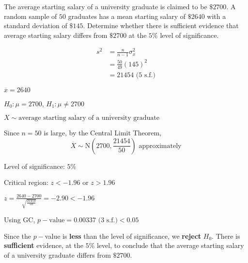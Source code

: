 \documentclass[11pt,a4paper]{book}
\begin{document}
\begin{example}

The average starting salary of a university graduate is claimed to
be $\$2700$. A random sample of $50$ graduates has a mean starting
salary of $\$2640$ with a standard deviation of $\$145$. Determine
whether there is sufficient evidence that average starting salary
differs from $\$2700$ at the $5\%$ level of significance.

\Solution

\begin{align*}
s^{2} & =\frac{n}{n-1}\sigma_{x}^{2}\\
 & =\frac{50}{49}\left(145\right)^{2}\\
 & =21454\text{ (5 s.f.)}
\end{align*}

$\overline{x}=2640$

$H_{0}:\mu=2700$, $H_{1}:\mu\neq2700$

$X\sim\text{average starting salary of a university graduate}$

Since $n=50$ is large, by the Central Limit Theorem,
\[
\overline{X}\sim\text{N}\left(2700,\frac{21454}{50}\right)\text{ approximately}
\]

Level of significance: $5\%$

Critical region: $z<-1.96$ or $z>1.96$

${\displaystyle z=\frac{2640-2700}{\sqrt{\frac{21454}{50}}}}=-2.90<-1.96$

Using GC, $p-\text{value}=0.00337\text{ (3 s.f.)}<0.05$

\begin{tcolorbox}[colback=white, colframe=black,boxrule=.4pt, sharpish corners]

Since the $p-$value is \textbf{less} than the level of significance,
we \textbf{reject} $H_{0}$. There is \textbf{sufficient} evidence,
at the $5\%$ level, to conclude that the average starting salary
of a university graduate differs from $\$2700$.
\end{tcolorbox}

\end{example}

\newpage
\end{document}
